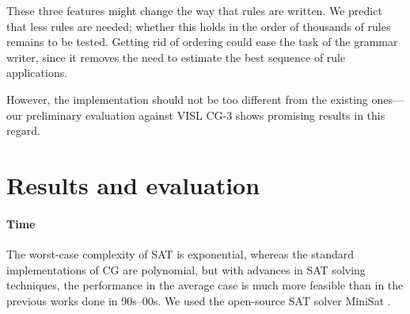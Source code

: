 \documentclass[11pt]{article}
\newcommand{\todo}[1]{{\color{cyan}\textbf{[TODO: }#1\textbf{]}}}
\begin{document}



\noindent These three features might change the way that rules are written. 
We predict that less rules are needed; whether this holds in
the order of thousands of rules remains to be tested.
Getting rid of ordering could ease the task of the grammar writer,
since it removes the need to estimate the best sequence of rule
applications.

However, the implementation should not be too different from the
existing ones---our preliminary evaluation against VISL CG-3 shows
promising results in this regard.
\pagebreak

\section{Results and evaluation}

\paragraph{Time}

The worst-case complexity of SAT is exponential, whereas the standard
implementations of CG are polynomial, but with advances in SAT solving
techniques, the performance in the average case is much more feasible than in the previous works done in 90s--00s.
We used the open-source SAT solver MiniSat \cite{een04sat}.
\end{document}
